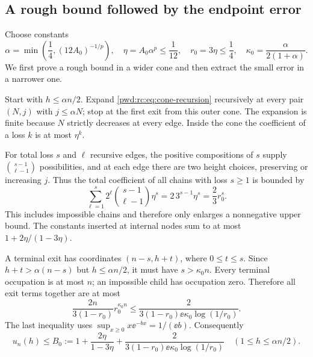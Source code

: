 \documentclass[11pt,letterpaper]{article}
\numberwithin{equation}{section}
\theoremstyle{remark}\newtheorem{remark}[theorem]{Remark}
\begin{document}
\subsection{A rough bound followed by the endpoint error}
Choose constants
\begin{equation}\label{pwd:rc:eq:cone-constants}
 \alpha=\min\left(\frac14,(12A_0)^{-1/p}\right),\quad
 \eta=A_0\alpha^p\le\frac1{12},\quad r_0=3\eta\le\frac14,\quad
 \kappa_0=\frac{\alpha}{2(1+\alpha)}.
\end{equation}
We first prove a rough bound in a wider cone and then extract the small error in a narrower one.

Start with $h\le\alpha n/2$. Expand \eqref{pwd:rc:eq:cone-recursion} recursively at every pair $(N,j)$ with $j\le\alpha N$; stop at the first exit from this outer cone. The expansion is finite because $N$ strictly decreases at every edge. Inside the cone the coefficient of a loss $k$ is at most $\eta^k$.

For total loss $s$ and $\ell$ recursive edges, the positive compositions of $s$ supply $\binom{s-1}{\ell-1}$ possibilities, and at each edge there are two height choices, preserving or increasing $j$. Thus the total coefficient of all chains with loss $s\ge1$ is bounded by
\begin{equation}\label{pwd:rc:eq:chain-count}
 \sum_{\ell=1}^s2^\ell\binom{s-1}{\ell-1}\eta^s
 =2\,3^{s-1}\eta^s=\frac23r_0^s.
\end{equation}
This includes impossible chains and therefore only enlarges a nonnegative upper bound. The constants inserted at internal nodes sum to at most
$1+2\eta/(1-3\eta)$.

A terminal exit has coordinates $(n-s,h+t)$, where $0\le t\le s$. Since $h+t>\alpha(n-s)$ but $h\le\alpha n/2$, it must have $s>\kappa_0n$. Every terminal occupation is at most $n$; an impossible child has occupation zero. Therefore all exit terms together are at most
\begin{equation}\label{pwd:rc:eq:exit-bound}
 \frac{2n}{3(1-r_0)}r_0^{\kappa_0n}
 \le\frac{2}{3(1-r_0)\ee\kappa_0\log(1/r_0)}.
\end{equation}
The last inequality uses $\sup_{x\ge0}x\ee^{-bx}=1/(\ee b)$. Consequently
\begin{equation}\label{pwd:rc:eq:B-bound}
 u_n(h)\le B_0:=1+\frac{2\eta}{1-3\eta}
 +\frac{2}{3(1-r_0)\ee\kappa_0\log(1/r_0)}
 \quad(1\le h\le\alpha n/2).
\end{equation}
\end{document}
